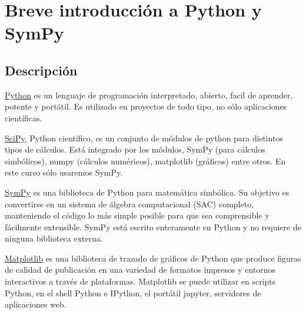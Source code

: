 \appendix
\chapter{Breve introducci\'on a Python y SymPy}




\section{Descripción}
\href{https://www.python.org/}{Python} es un lenguaje de programación interpretado, 
abierto, facil de aprender, potente y portátil. Es utilizado en proyectos de todo tipo, 
no sólo aplicaciones científicas.



\href{http://www.scipy.org/}{SciPy}, 
Python científico, es un conjunto de módulos de python para distintos tipos de cálculos. 
Está integrado por los módulos, SymPy (para cálculos simbólicos), 
numpy (cálculos numéricos), matplotlib (gráficos) entre otros.  
En este curso sólo usaremos SymPy.


\href{http://www.sympy.org/}{SymPy}
es una biblioteca de Python para matemática simbólica. Su objetivo es convertirse en 
un sistema de álgebra computacional (SAC) completo, manteniendo el código lo más simple 
posible para que sea comprensible y fácilmente extensible. SymPy está escrito enteramente 
en Python y no requiere de ninguna biblioteca externa.
% 
% 



\href{http://matplotlib.org/}{Matplotlib} es una biblioteca de trazado de gráficos de Python que produce figuras de calidad de publicación en una variedad de formatos impresos y entornos interactivos a través de plataformas. Matplotlib se puede utilizar en scripts Python, en el shell Python e IPython, el portátil jupyter, servidores de aplicaciones web.






